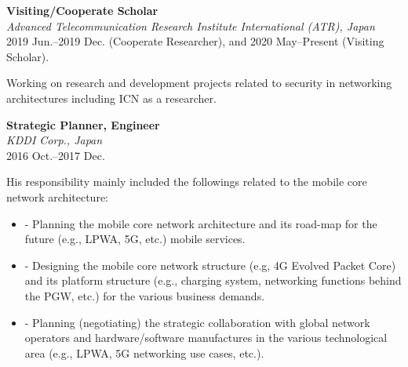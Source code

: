 \textbf{Visiting/Cooperate Scholar}\\
\hspace*{4ex}\textit{Advanced Telecommunication Research Institute International (ATR), Japan}\\
\hspace*{4ex}2019 Jun.--2019 Dec. (Cooperate Researcher), and 2020 May--Present (Visiting Scholar).

\hspace*{4ex} Working on research and development projects related to security in networking architectures including ICN as a researcher.
\vspace*{2ex}



\textbf{Strategic Planner, Engineer}\\
\hspace*{4ex}\textit{KDDI Corp., Japan}\\
\hspace*{4ex}2016 Oct.--2017 Dec.

\hspace*{4ex} His responsibility mainly included the followings related to the mobile core network architecture:
\begin{itemize}
 \item \hspace*{4ex}\begin{minipage}{0.9\linewidth}
- Planning the mobile core network architecture and its road-map for the future (e.g., LPWA, 5G, etc.) mobile services.\end{minipage}
 \item \hspace*{4ex}\begin{minipage}{0.9\linewidth}
- Designing the mobile core network structure (e.g, 4G Evolved Packet Core) and its platform structure (e.g., charging system, networking functions behind the PGW, etc.) for the various business demands.
\end{minipage}
 \item \hspace*{4ex}\begin{minipage}{0.9\linewidth}
- Planning (negotiating) the strategic collaboration with global network operators and hardware/software manufactures in the various technological area (e.g., LPWA, 5G networking use cases, etc.).
\end{minipage}
\end{itemize}
\vspace*{2ex}

